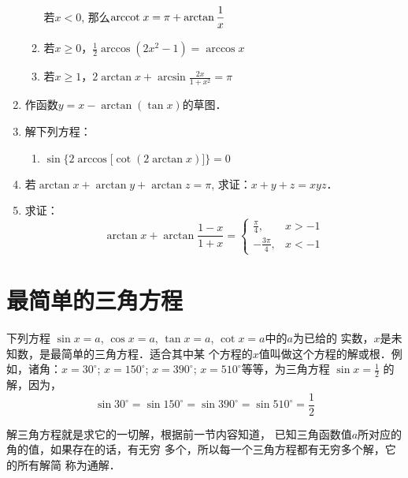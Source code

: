 \begin{enumerate}
\begin{enumerate}
若$x<0$, 那么${\rm arccot\; } x=\pi+\arctan\dfrac{1}{x}$

\item 若$x\ge 0$，$\frac{1}{2}\arccos(2x^2-1)=\arccos x$
\item 若$x\ge 1$，$2\arctan x+\arcsin\frac{2x}{1+x^2}=\pi$
\end{enumerate}

\item 作函数$y=x-\arctan(\tan x)$的草图．

\item 解下列方程：
\begin{enumerate}
    \item $\sin\Big\{2\arccos\big[\cot(2\arctan x)\big]\Big\}=0$
\end{enumerate}

\item 若$\arctan x+\arctan y+ \arctan z=\pi$, 
求证：$x+y+z=xyz$．

\item 求证：
\[\arctan x+\arctan\frac{1-x}{1+x}=\begin{cases}
    \frac{\pi}{4},& x>-1\\
    -\frac{3\pi}{4},& x<-1
\end{cases}\]
\end{enumerate}

\section{最简单的三角方程}
下列方程
$\sin x=a$, $\cos x=a$, $\tan x=a$, $\cot x=a$中的$a$为已给的
实数，$x$是未知数，是最简单的三角方程．适合其中某
个方程的$x$值叫做这个方程的解或根．例如，诸角：$x=
30^{\circ}$; $x=150^{\circ}$; $x=390^{\circ}$; $x=510^{\circ}$等等，为三角方程
$\sin x=\frac{1}{2}$
的解，因为，\[\sin30^{\circ}=\sin150^{\circ}=\sin390^{\circ}=\sin510^{\circ}=\frac{1}{2}\]

解三角方程就是求它的一切解，根据前一节内容知道，
已知三角函数值$a$所对应的角的值，如果存在的话，有无穷
多个，所以每一个三角方程都有无穷多个解，它的所有解简
称为通解．

